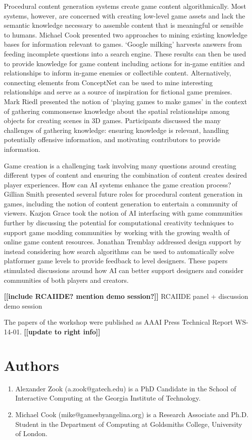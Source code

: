 \documentclass[10pt,a4paper]{article}
\newcommand{\mytodo}[1]{\textbf{[[#1]]}}
\begin{document}
Procedural content generation systems create game content algorithmically.
Most systems, however, are concerned with creating low-level game assets and lack the semantic knowledge necessary to assemble content that is meaningful or sensible to humans.
Michael Cook presented two approaches to mining existing knowledge bases for information relevant to games.
`Google milking' harvests answers from feeding incomplete questions into a search engine.
These results can then be used to provide knowledge for game content including actions for in-game entities and relationships to inform in-game enemies or collectible content.
Alternatively, connecting elements from ConceptNet can be used to mine interesting relationships and serve as a source of inspiration for fictional game premises.
Mark Riedl presented the notion of `playing games to make games' in the context of gathering commonsense knowledge about the spatial relationships among objects for creating scenes in 3D games.
Participants discussed the many challenges of gathering knowledge: ensuring knowledge is relevant, handling potentially offensive information, and motivating contributors to provide information.


Game creation is a challenging task involving many questions around creating different types of content and ensuring the combination of content creates desired player experiences.
How can AI systems enhance the game creation process?
Gillian Smith presented several future roles for procedural content generation in games, including the notion of content generation to entertain a community of viewers.
Kazjon Grace took the notion of AI interfacing with game communities further by discussing the potential for computational creativity techniques to support game modding communities by working with the growing wealth of online game content resources.
Jonathan Tremblay addressed design support by instead considering how search algorithms can be used to automatically solve platformer game levels to provide feedback to level designers.
These papers stimulated discussions around how AI can better support designers and consider communities of both players and creators.


\mytodo{include RCAIIDE? mention demo session?}
RCAIIDE panel + discussion
demo session

The papers of the workshop were published as AAAI Press Technical Report WS-14-01.
\mytodo{update to right info}


\section*{Authors}
\begin{enumerate}
\item Alexander Zook (a.zook@gatech.edu) is a PhD Candidate in the School of Interactive Computing at the Georgia Institute of Technology.
\item Michael Cook (mike@gamesbyangelina.org) is a Research Associate and Ph.D. Student in the Department of Computing at Goldsmiths College, University of London.
\end{enumerate}
\end{document}
